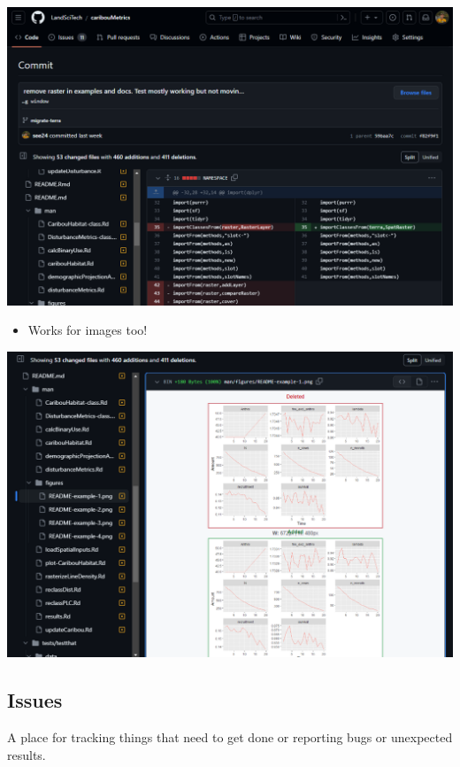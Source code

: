 \documentclass[
  letterpaper,
  DIV=11,
  numbers=noendperiod]{scrreprt}
\providecommand{\tightlist}{%
  \setlength{\itemsep}{0pt}\setlength{\parskip}{0pt}}\usepackage{longtable,booktabs,array}
\begin{document}
\includegraphics{assets/img/view_commit.png}

\begin{itemize}
\tightlist
\item
  Works for images too!
\end{itemize}

\includegraphics{assets/img/view_commit_img.png}

\hypertarget{issues}{%
\subsection{Issues}\label{issues}}

A place for tracking things that need to get done or reporting bugs or
unexpected results.
\end{document}
